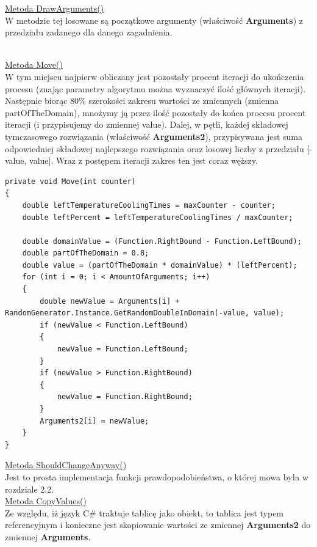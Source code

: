\documentclass[twoside]{projektInzynierskiMS1}
\newcommand{\si}{ś}
\begin{document}
\underline{Metoda DrawArguments()} \\
W metodzie tej losowane są początkowe argumenty (wła\si ciwo\si ć \textbf{Arguments}) z przedziału zadanego dla danego zagadnienia. \\\

\underline{Metoda Move()} \\
W tym miejscu najpierw obliczany jest pozostały procent iteracji do ukończenia procesu (znając parametry algorytmu można wyznaczyć ilo\si ć głównych iteracji). Następnie biorąc 80\% szeroko\si ci zakresu warto\si ci ze zmiennych (zmienna partOfTheDomain), mnożymy ją przez ilo\si ć pozostały do końca procesu procent iteracji (i przypisujemy do zmiennej value). Dalej, w pętli, każdej składowej tymczasowego rozwiązania (wła\si ciwo\si ć \textbf{Arguments2}), przypisywana jest suma odpowiedniej składowej najlepszego rozwiązania oraz losowej liczby z przedziału [-value, value]. Wraz z postępem iteracji zakres ten jest coraz węższy. \\
\begin{verbatim}
private void Move(int counter)
{
    double leftTemperatureCoolingTimes = maxCounter - counter;
    double leftPercent = leftTemperatureCoolingTimes / maxCounter;

    double domainValue = (Function.RightBound - Function.LeftBound);
    double partOfTheDomain = 0.8;
    double value = (partOfTheDomain * domainValue) * (leftPercent);
    for (int i = 0; i < AmountOfArguments; i++)
    {
        double newValue = Arguments[i] + 
RandomGenerator.Instance.GetRandomDoubleInDomain(-value, value);
        if (newValue < Function.LeftBound)
        {
            newValue = Function.LeftBound;
        }
        if (newValue > Function.RightBound)
        {
            newValue = Function.RightBound;
        }
        Arguments2[i] = newValue;
    }
}
\end{verbatim}

\underline{Metoda ShouldChangeAnyway()} \\
Jest to prosta implementacja funkcji prawdopodobieństwa, o której mowa była w rozdziale 2.2. \\

\underline{Metoda CopyValues()} \\
Ze względu, iż język C\# traktuje tablicę jako obiekt, to tablica jest typem referencyjnym i konieczne jest skopiowanie warto\si ci ze zmiennej \textbf{Arguments2} do zmiennej \textbf{Arguments}. \\
\end{document}
